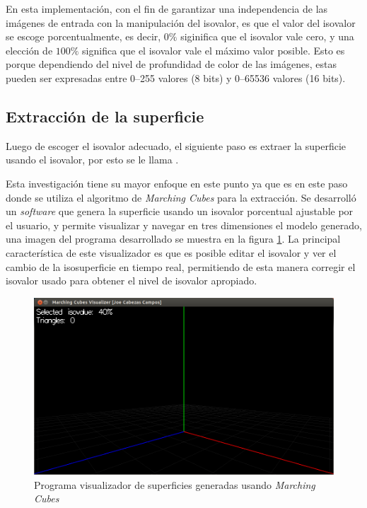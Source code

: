 En esta implementación, con el fin de garantizar una independencia de las imágenes de entrada con la manipulación del isovalor, es que el valor del isovalor se escoge porcentualmente, es decir, $0\%$ siginifica que el isovalor vale cero, y una elección de $100\%$ significa que el isovalor vale el máximo valor posible. Esto es porque dependiendo del nivel de profundidad de color de las imágenes, estas pueden ser expresadas entre 0--255 valores (8 bits) y 0--65536 valores (16 bits).

\subsection{Extracción de la superficie}
\label{ch:propuesta:sec:extraccionDeLaSuperficie}

Luego de escoger el isovalor adecuado, el siguiente paso es extraer la superficie usando el isovalor, por esto se le llama .

Esta investigación tiene su mayor enfoque en este punto ya que es en este paso donde se utiliza el algoritmo de \emph{Marching Cubes} para la extracción. Se desarrolló un \emph{software} que genera la superficie usando un isovalor porcentual ajustable por el usuario, y permite visualizar y navegar en tres dimensiones el modelo generado, una imagen del programa desarrollado se muestra en la figura \ref{f:flujoDeTrabajo:visualizer_1}. La principal característica de este visualizador es que es posible editar el isovalor y ver el cambio de la isosuperficie en tiempo real, permitiendo de esta manera corregir el isovalor usado para obtener el nivel de isovalor apropiado.

\begin{figure}[h]
\centering
	\includegraphics[width=1.0\textwidth]{images/visualizer/visualizer_1.png}
\caption{Programa visualizador de superficies generadas usando \emph{Marching Cubes}}
\label{f:flujoDeTrabajo:visualizer_1}
\end{figure}

